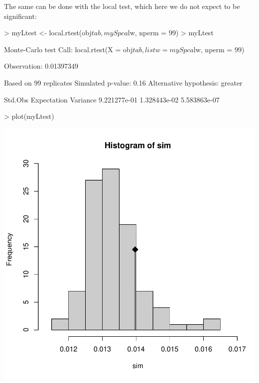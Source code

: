 \documentclass{article}
\begin{document}
The same can be done with the local test, which here we do not expect
to be significant:
\begin{Schunk}
\begin{Sinput}
> myLtest <- local.rtest(obj$tab, mySpca$lw, nperm = 99)
> myLtest
\end{Sinput}
\begin{Soutput}
Monte-Carlo test
Call: local.rtest(X = obj$tab, listw = mySpca$lw, nperm = 99)

Observation: 0.01397349 

Based on 99 replicates
Simulated p-value: 0.16 
Alternative hypothesis: greater 

     Std.Obs  Expectation     Variance 
9.221277e-01 1.328443e-02 5.583863e-07 
\end{Soutput}
\begin{Sinput}
> plot(myLtest)
\end{Sinput}
\end{Schunk}
\includegraphics{figs/spca-localrtest}
~\\
\end{document}
